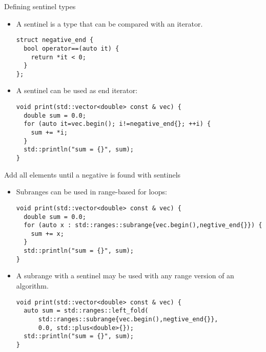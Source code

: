 \begin{frame}[t,fragile]{Defining sentinel types}
\begin{itemize}
  \item A sentinel is a type that can be compared with an iterator.
\begin{lstlisting}
struct negative_end {
  bool operator==(auto it) {
    return *it < 0;
  }
};
\end{lstlisting}
  \item A sentinel can be used as end iterator:
\begin{lstlisting}
void print(std::vector<double> const & vec) {
  double sum = 0.0;
  for (auto it=vec.begin(); i!=negative_end{}; ++i) {
    sum += *i;
  }
  std::println("sum = {}", sum);
}
\end{lstlisting}
\end{itemize}
\end{frame}

\begin{frame}[t,fragile]{Add all elements until a negative is found with
sentinels}
\begin{itemize}
  \item Subranges can be used in range-based for loops:
\begin{lstlisting}
void print(std::vector<double> const & vec) {
  double sum = 0.0;
  for (auto x : std::ranges::subrange{vec.begin(),negtive_end{}}) {
    sum += x;
  }
  std::println("sum = {}", sum);
}
\end{lstlisting}

  \item A subrange with a sentinel may be used with any range version of an
        algorithm.

\begin{lstlisting}
void print(std::vector<double> const & vec) {
  auto sum = std::ranges::left_fold(
      std::ranges::subrange{vec.begin(),negtive_end{}},
      0.0, std::plus<double>{});
  std::println("sum = {}", sum);
}
\end{lstlisting}
\end{itemize}
\end{frame}

